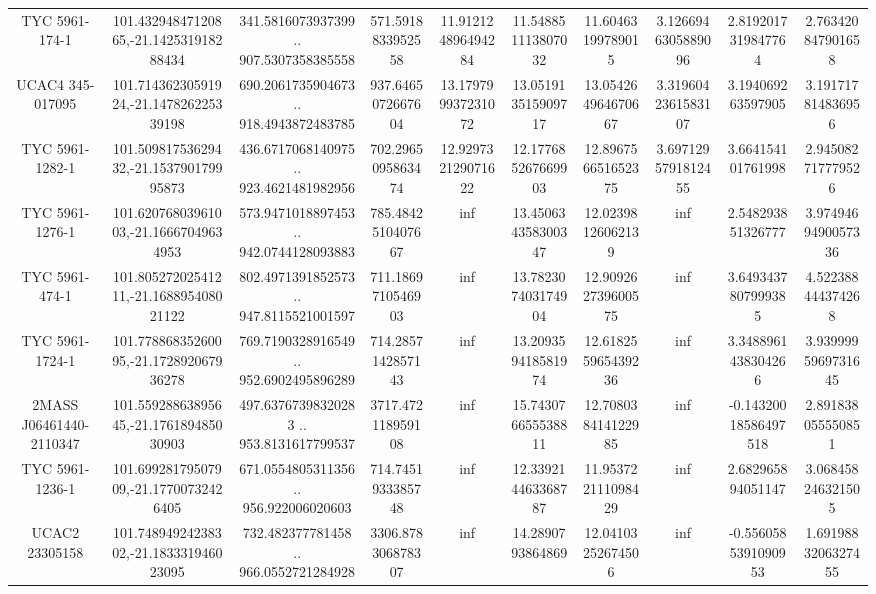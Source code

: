 \begin{table}
\begin{tabular}{cccccccccc}
TYC 5961-174-1 & 101.43294847120865,-21.142531918288434 & 341.5816073937399 .. 907.5307358385558 & 571.5918833952558 & 11.912124896494284 & 11.548851113807032 & 11.60463199789015 & 3.1266946305889096 & 2.8192017319847764 & 2.763420847901658 \\
UCAC4 345-017095 & 101.71436230591924,-21.147826225339198 & 690.2061735904673 .. 918.4943872483785 & 937.6465072667604 & 13.179799937231072 & 13.051913515909717 & 13.054264964670667 & 3.3196042361583107 & 3.194069263597905 & 3.191717814836956 \\
TYC 5961-1282-1 & 101.50981753629432,-21.153790179995873 & 436.6717068140975 .. 923.4621481982956 & 702.2965095863474 & 12.929732129071622 & 12.177685267669903 & 12.896756651652375 & 3.6971295791812455 & 3.664154101761998 & 2.945082717779526 \\
TYC 5961-1276-1 & 101.62076803961003,-21.16667049634953 & 573.9471018897453 .. 942.0744128093883 & 785.4842510407667 & inf & 13.450634358300347 & 12.02398126062139 & inf & 2.548293851326777 & 3.9749469490057336 \\
TYC 5961-474-1 & 101.80527202541211,-21.168895408021122 & 802.4971391852573 .. 947.8115521001597 & 711.1869710546903 & inf & 13.782307403174904 & 12.909262739600575 & inf & 3.6493437807999385 & 4.522388444374268 \\
TYC 5961-1724-1 & 101.77886835260095,-21.172892067936278 & 769.7190328916549 .. 952.6902495896289 & 714.2857142857143 & inf & 13.209359418581974 & 12.618255965439236 & inf & 3.3488961438304266 & 3.9399995969731645 \\
2MASS J06461440-2110347 & 101.55928863895645,-21.176189485030903 & 497.63767398320283 .. 953.8131617799537 & 3717.472118959108 & inf & 15.743076655538811 & 12.708038414122985 & inf & -0.14320018586497518 & 2.891838055550851 \\
TYC 5961-1236-1 & 101.69928179507909,-21.17700732426405 & 671.0554805311356 .. 956.922006020603 & 714.7451933385748 & inf & 12.339214463368787 & 11.953722111098429 & inf & 2.682965894051147 & 3.068458246321505 \\
UCAC2  23305158 & 101.74894924238302,-21.183331946023095 & 732.482377781458 .. 966.0552721284928 & 3306.878306878307 & inf & 14.2890793864869 & 12.04103252674506 & inf & -0.5560585391090953 & 1.6919883206327455 \\
\end{tabular}
\end{table}
